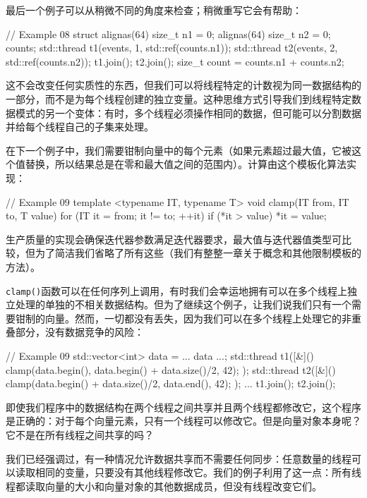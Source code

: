 最后一个例子可以从稍微不同的角度来检查；稍微重写它会有帮助：

\begin{code}
// Example 08
struct {
  alignas(64) size_t n1 = 0;
  alignas(64) size_t n2 = 0;
} counts;
std::thread t1(events, 1, std::ref(counts.n1));
std::thread t2(events, 2, std::ref(counts.n2));
t1.join();
t2.join();
size_t count = counts.n1 + counts.n2;
\end{code}

这不会改变任何实质性的东西，但我们可以将线程特定的计数视为同一数据结构的一部分，而不是为每个线程创建的独立变量。这种思维方式引导我们到线程特定数据模式的另一个变体：有时，多个线程必须操作相同的数据，但可能可以分割数据并给每个线程自己的子集来处理。

在下一个例子中，我们需要钳制向量中的每个元素（如果元素超过最大值，它被这个值替换，所以结果总是在零和最大值之间的范围内）。计算由这个模板化算法实现：

\begin{code}
// Example 09
template <typename IT, typename T>
void clamp(IT from, IT to, T value) {
  for (IT it = from; it != to; ++it) {
    if (*it > value) *it = value;
  }
}
\end{code}

生产质量的实现会确保迭代器参数满足迭代器要求，最大值与迭代器值类型可比较，但为了简洁我们省略了所有这些（我们有整整一章关于概念和其他限制模板的方法）。

\texttt{clamp()}函数可以在任何序列上调用，有时我们会幸运地拥有可以在多个线程上独立处理的单独的不相关数据结构。但为了继续这个例子，让我们说我们只有一个需要钳制的向量。然而，一切都没有丢失，因为我们可以在多个线程上处理它的非重叠部分，没有数据竞争的风险：

\begin{code}
// Example 09
std::vector<int> data = ... data ...;
std::thread t1([&](){
  clamp(data.begin(), data.begin() + data.size()/2, 42);
});
std::thread t2([&](){
  clamp(data.begin() + data.size()/2, data.end(), 42);
});
...
t1.join();
t2.join();
\end{code}

即使我们程序中的数据结构在两个线程之间共享并且两个线程都修改它，这个程序是正确的：对于每个向量元素，只有一个线程可以修改它。但是向量对象本身呢？它不是在所有线程之间共享的吗？

我们已经强调过，有一种情况允许数据共享而不需要任何同步：任意数量的线程可以读取相同的变量，只要没有其他线程修改它。我们的例子利用了这一点：所有线程都读取向量的大小和向量对象的其他数据成员，但没有线程改变它们。

